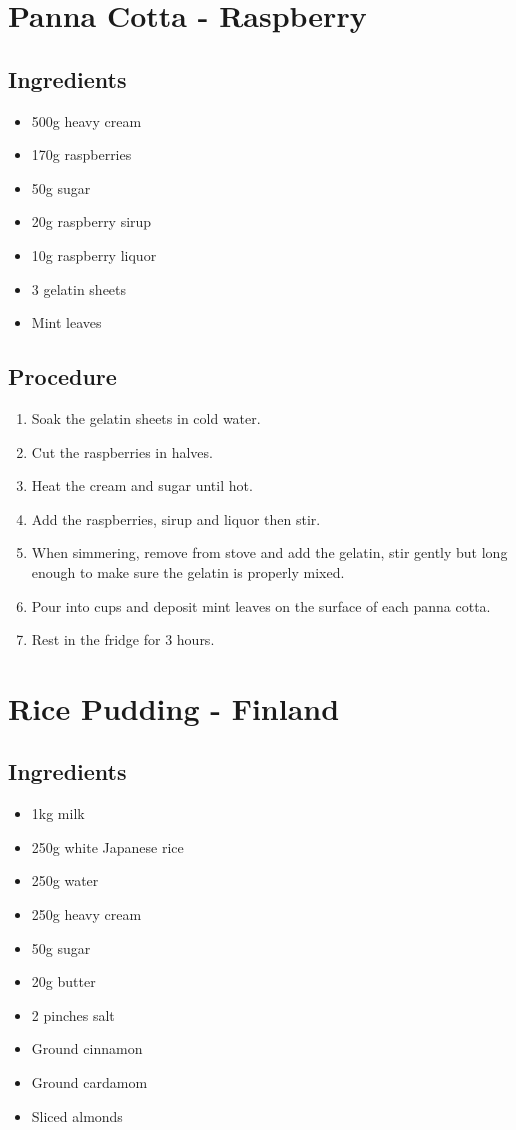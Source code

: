 \documentclass[10pt]{book}
\begin{document}

\newpage
\section*{Panna Cotta - Raspberry}
\subsection*{Ingredients}
	\begin{itemize}
		\item 500g heavy cream
		\item 170g raspberries
		\item 50g sugar
		\item 20g raspberry sirup
		\item 10g raspberry liquor
		\item 3 gelatin sheets
		\item Mint leaves
	\end{itemize}
\subsection*{Procedure}
	\begin{enumerate}
		\item Soak the gelatin sheets in cold water.
		\item Cut the raspberries in halves.
		\item Heat the cream and sugar until hot.
		\item Add the raspberries, sirup and liquor then stir.
		\item When simmering, remove from stove and add the gelatin, stir gently but long enough to make sure the gelatin is properly mixed.
		\item Pour into cups and deposit mint leaves on the surface of each panna cotta.
		\item Rest in the fridge for 3 hours.
	\end{enumerate}
\newpage


\newpage
\section*{Rice Pudding - Finland}
\subsection*{Ingredients}
	\begin{itemize}
		\item 1kg milk
		\item 250g white Japanese rice
		\item 250g water
		\item 250g heavy cream
		\item 50g sugar
		\item 20g butter
		\item 2 pinches salt
		\item Ground cinnamon
		\item Ground cardamom
		\item Sliced almonds
	\end{itemize}
\end{document}
